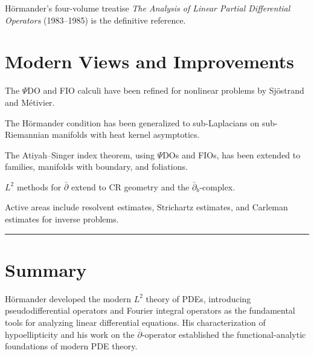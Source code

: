 Hörmander's four-volume treatise \emph{The Analysis of Linear Partial Differential
Operators} (1983--1985) is the definitive reference.

\section{Modern Views and Improvements}

The $\Psi$DO and FIO calculi have been refined for nonlinear problems by
Sjöstrand and Métivier.

The Hörmander condition has been generalized to sub-Laplacians on sub-Riemannian
manifolds with heat kernel asymptotics.

The Atiyah--Singer index theorem, using $\Psi$DOs and FIOs, has been extended to
families, manifolds with boundary, and foliations.

$L^2$ methods for $\bar{\partial}$ extend to CR geometry and the
$\bar{\partial}_b$-complex.

Active areas include resolvent estimates, Strichartz estimates, and Carleman
estimates for inverse problems.

\begin{center}\rule{0.5\linewidth}{0.5pt}\end{center}

\section*{Summary}

Hörmander developed the modern $L^2$ theory of PDEs, introducing pseudodifferential
operators and Fourier integral operators as the fundamental tools for analyzing
linear differential equations. His characterization of hypoellipticity and his work
on the $\overline{\partial}$-operator established the functional-analytic
foundations of modern PDE theory.

